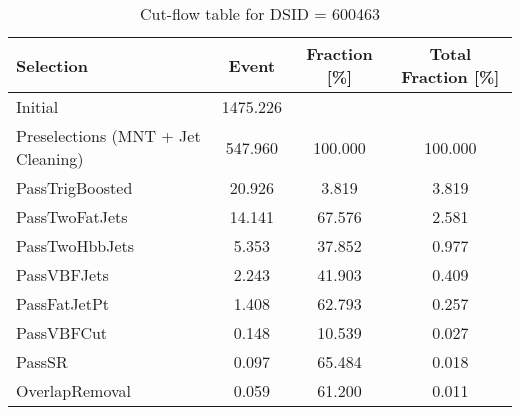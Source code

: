 \begin{table}[ht]
    \centering
    \begin{tabular}{lccc}
        \hline  \hline
        Selection                          & Event    & Fraction [\%] & Total Fraction [\%] \\
        \hline  \hline
        Initial                            & 1475.226 &               &                     \\
        Preselections (MNT + Jet Cleaning) & 547.960  & 100.000       & 100.000             \\
        PassTrigBoosted                    & 20.926   & 3.819         & 3.819               \\
        PassTwoFatJets                     & 14.141   & 67.576        & 2.581               \\
        PassTwoHbbJets                     & 5.353    & 37.852        & 0.977               \\
        PassVBFJets                        & 2.243    & 41.903        & 0.409               \\
        PassFatJetPt                       & 1.408    & 62.793        & 0.257               \\
        PassVBFCut                         & 0.148    & 10.539        & 0.027               \\
        PassSR                             & 0.097    & 65.484        & 0.018               \\
        OverlapRemoval                     & 0.059    & 61.200        & 0.011               \\
        \hline  \hline
    \end{tabular}
    \caption{Cut-flow table for DSID = 600463}
    \label{cutflow_dsid600463}
\end{table}

